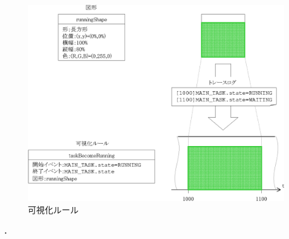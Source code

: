 \begin{figure}[p]
\begin{center}
\includegraphics{img/timeShape.eps}
\caption{可視化ルール}
\label{fig:timeShape}
\end{center}
\end{figure}
．
